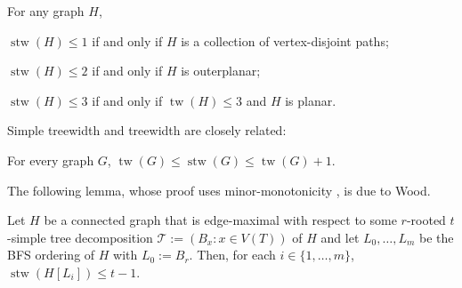 \documentclass[kpfonts]{patmorin}
\DeclareMathOperator{\tw}{tw}
\DeclareMathOperator{\stw}{stw}
\theoremstyle{named}
\begin{document}
\begin{lem}\label{simple-small-cases}
    For any graph $H$,
    \begin{compactenum}[(i)]
        \item $\stw(H)\le 1$ if and only if $H$ is a collection of vertex-disjoint paths;
        \item $\stw(H)\le 2$ if and only if $H$ is outerplanar;
        \item $\stw(H)\le 3$ if and only if $\tw(H)\le 3$ and $H$ is planar.
    \end{compactenum}
\end{lem}

Simple treewidth and treewidth are closely related:

\begin{lem}\label{simple-treewidth-vs-treewidth}
    For every graph $G$, $\tw(G)\le \stw(G)\le \tw(G)+1$.
\end{lem}

%

The following lemma, whose proof uses minor-monotonicity \cite[Theorem~5.2]{wulf:stacked}, is due to Wood.

\begin{lem}\label{simple-bfs-layers}
    Let $H$ be a connected graph that is edge-maximal with respect to some $r$-rooted $t$-simple tree decomposition $\mathcal{T}:=(B_x:x\in V(T))$ of $H$ and let $L_0,\ldots,L_m$ be the BFS ordering of $H$ with $L_0:=B_r$.   Then, for each $i\in\{1,\ldots,m\}$, $\stw(H[L_i])\le t-1$.
\end{lem}
\end{document}
